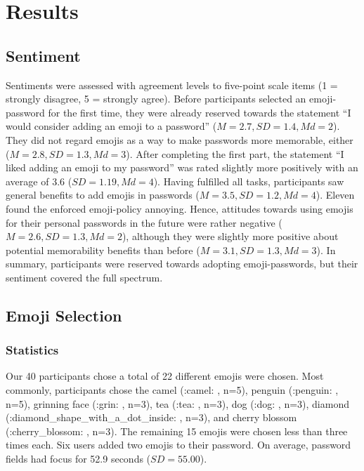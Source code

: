 \section{Results}
\subsection{Sentiment}
Sentiments were assessed with agreement levels to five-point scale items (1 = strongly disagree, 5 = strongly agree).
Before participants selected an emoji-password for the first time, they were already reserved towards the statement ``I would consider adding an emoji to a password'' ($M=2.7, SD = 1.4, Md=2$). They did not regard emojis as a way to make passwords more memorable, either ($M=2.8, SD = 1.3, Md=3$).
After completing the first part, the statement ``I liked adding an emoji to my password'' was rated slightly more positively with an average of 3.6 ($SD=1.19, Md=4$). 
Having fulfilled all tasks, participants saw general benefits to add emojis in passwords ($M=3.5, SD = 1.2, Md=4$). Eleven found the enforced emoji-policy annoying. Hence, attitudes towards using emojis for their personal passwords in the future were rather negative ($M=2.6, SD = 1.3, Md=2$), although they were slightly more positive about potential memorability benefits than before ($M=3.1, SD = 1.3, Md=3$). In summary, participants were reserved towards adopting emoji-passwords, but their sentiment covered the full spectrum. 

\subsection{Emoji Selection}
\subsubsection{Statistics}
Our 40 participants chose a total of 22 different emojis were chosen. Most commonly, participants chose the camel (:camel: , n=5), penguin (:penguin: , n=5), grinning face (:grin: , n=3), tea (:tea: , n=3), dog (:dog: , n=3), diamond (:diamond\_shape\_with\_a\_dot\_inside: , n=3), and cherry blossom (:cherry\_blossom: , n=3). The remaining 15 emojis were chosen less than three times each. Six users added two emojis to their password. On average, password fields had focus for 52.9 seconds ($SD = 55.00$).

